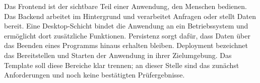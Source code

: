 \begin{beginnerstatement}

Das Frontend ist der sichtbare Teil einer Anwendung, den Menschen bedienen.
Das Backend arbeitet im Hintergrund und verarbeitet Anfragen oder stellt Daten
bereit. Eine Desktop-Schicht bindet die Anwendung an ein Betriebssystem und
ermöglicht dort zusätzliche Funktionen. Persistenz sorgt dafür, dass Daten
über das Beenden eines Programms hinaus erhalten bleiben. Deployment bezeichnet
das Bereitstellen und Starten der Anwendung in ihrer Zielumgebung. Das Template
soll diese Bereiche klar trennen; an dieser Stelle sind das zunächst
Anforderungen und noch keine bestätigten Prüfergebnisse.

\end{beginnerstatement}
